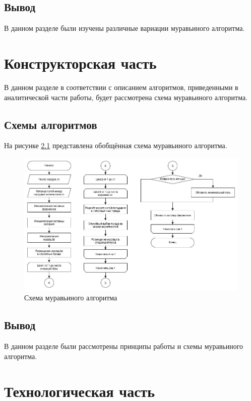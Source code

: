 \documentclass[12pt, a4paper]{report}
\begin{document}
	\section{Вывод}
	
	В данном разделе были изучены различные вариации муравьиного алгоритма.

	\chapter{Конструкторская часть}
	
	В данном разделе в соответствии с описанием алгоритмов, приведенными в аналитической части работы, будет рассмотрена схема муравьиного
	алгоритма.
	
	\section{Схемы алгоритмов}
	
	На рисунке \ref{ris:aco} представлена обобщённая схема муравьиного алгоритма.
	
	\begin{figure}[ht!]
		\centering
		\includegraphics[scale=0.5]{img/aco.jpg}
		\caption{Схема муравьиного алгоритма}
		\label{ris:aco}
	\end{figure}

	\section{Вывод}
	
	В данном разделе были рассмотрены принципы работы и схемы муравьиного алгоритма.
	
    \chapter{Технологическая часть}
    
\end{document}
